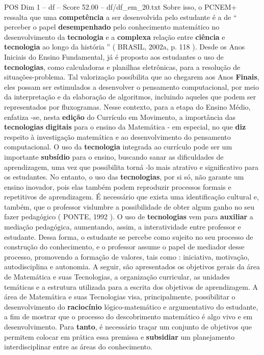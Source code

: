 \begin{textsample}{POS Dim 1 – df – Score 52.00 – df/df\_em\_20.txt}
Sobre isso, o PCNEM+ ressalta que uma \textbf{competência} a ser desenvolvida pelo estudante é a de “ perceber o papel \textbf{desempenhado} pelo conhecimento matemático no desenvolvimento da \textbf{tecnologia} e a \textbf{complexa} relação entre \textbf{ciência} e \textbf{tecnologia} ao longo da história ” ( BRASIL, 2002a, p. 118 ).
Desde os Anos Iniciais do Ensino Fundamental, já é proposto aos estudantes o uso de \textbf{tecnologias}, como calculadoras e planilhas eletrônicas, para a resolução de situações-problema.
Tal valorização possibilita que ao chegarem aos Anos \textbf{Finais}, eles possam ser estimulados a desenvolver o pensamento computacional, por meio da interpretação e da elaboração de algoritmos, incluindo aqueles que podem ser representados por fluxogramas.
Nesse contexto, para a etapa do Ensino Médio, enfatiza -se, nesta \textbf{edição} do Currículo em Movimento, a importância das \textbf{tecnologias} \textbf{digitais} para o ensino da Matemática - em especial, no que \textbf{diz} respeito à investigação matemática e ao desenvolvimento do pensamento computacional.
O uso da \textbf{tecnologia} integrada ao currículo pode ser um importante \textbf{subsídio} para o ensino, buscando sanar as dificuldades de aprendizagem, uma vez que possibilita torná -lo mais atrativo e significativo para os estudantes.
No entanto, o uso das \textbf{tecnologias}, por si só, não garante um ensino inovador, pois elas também podem reproduzir processos formais e repetitivos de aprendizagem.
É necessário que exista uma identificação cultural e, também, que o professor vislumbre a possibilidade de obter algum ganho no seu fazer pedagógico ( PONTE, 1992 ).
O uso de \textbf{tecnologias} vem para \textbf{auxiliar} a mediação pedagógica, aumentando, assim, a interatividade entre professor e estudante.
Dessa forma, o estudante se percebe como sujeito no seu processo de construção do conhecimento, e o professor assume o papel de mediador desse processo, promovendo a formação de valores, tais como : iniciativa, motivação, autodisciplina e autonomia.
A seguir, são apresentados os objetivos gerais da área de Matemática e suas Tecnologias, a organização curricular, as unidades temáticas e a estrutura utilizada para a escrita dos objetivos de aprendizagem.
A área de Matemática e suas Tecnologias visa, principalmente, possibilitar o desenvolvimento do \textbf{raciocínio} lógico-matemático e argumentativo do estudante, a fim de mostrar que o processo do descobrimento matemático é algo vivo e em desenvolvimento.
Para \textbf{tanto}, é necessário traçar um conjunto de objetivos que permitem colocar em prática essa premissa e \textbf{subsidiar} um planejamento interdisciplinar entre as áreas do conhecimento.

\end{textsample}
